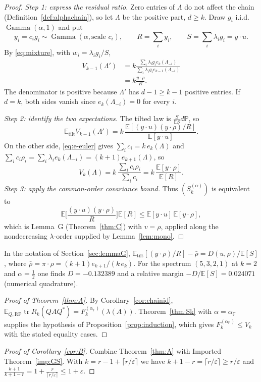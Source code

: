\documentclass[11pt,a4paper]{article}
\theoremstyle{definition}
\newcommand{\E}{\mathbb{E}}
\newcommand{\PP}{\mathbb{P}}
\newcommand{\F}{\mathbb{F}}
\newcommand{\tr}{\operatorname{tr}}
\newcommand{\Gam}{\operatorname{Gamma}}
\newcommand{\tilt}{\mathrm{tilt}}
\newcommand{\RP}{\mathrm{RP}}
\begin{document}
\begin{proof}
\emph{Step 1: express the residual ratio.}
Zero entries of $\Lambda$ do not affect the chain (Definition~\ref{def:alphachain}), so let $\Lambda$ be the positive part, $d\ge k$. Draw $g_i$ i.i.d.\ $\Gam(\alpha,1)$ and put
\[
y_i=c_ig_i\sim\Gam(\alpha,\text{scale }c_i),\qquad R=\sum_iy_i,\qquad S=\sum_i\lambda_ig_i=y\cdot u .
\]
By \eqref{eq:mixture}, with $w_i=\lambda_ig_i/S$,
\[
\begin{aligned}
V_{k-1}(\Lambda')
&=k\frac{\sum_i\lambda_ig_i e_k(\Lambda_{-i})}
          {\sum_i\lambda_ig_i e_{k-1}(\Lambda_{-i})}\\
&=k\frac{y\cdot\rho}{R}.
\end{aligned}
\]
The denominator is positive because $\Lambda'$ has $d-1\ge k-1$ positive entries. If $d=k$, both sides vanish since $e_k(\Lambda_{-i})=0$ for every $i$.

\emph{Step 2: identify the two expectations.}
The tilted law is $\frac S{\E S}d\PP$, so
\[
\E_\tilt V_{k-1}(\Lambda')=k\,\frac{\E[(y\cdot u)(y\cdot\rho)/R]}{\E[y\cdot u]}.
\]
On the other side, \eqref{eq:e-euler} gives $\sum_ic_i=k\,e_k(\Lambda)$ and $\sum_ic_i\rho_i=\sum_i\lambda_ie_k(\Lambda_{-i})=(k+1)e_{k+1}(\Lambda)$, so
\[
V_k(\Lambda)=k\,\frac{\sum_ic_i\rho_i}{\sum_ic_i}=k\,\frac{\E[y\cdot\rho]}{\E[R]}.
\]
\emph{Step 3: apply the common-order covariance bound.}
Thus $(S_k^{(\alpha)})$ is equivalent to
\[
\E\Big[\frac{(y\cdot u)(y\cdot\rho)}R\Big]\E[R]\le\E[y\cdot u]\,\E[y\cdot\rho],
\]
which is Lemma~G (Theorem~\ref{thm:C}) with $v=\rho$, applied along the nondecreasing $\lambda$-order supplied by Lemma~\ref{lem:mono}.
\end{proof}

In the notation of Section~\ref{sec:lemmaG}, $\E_\tilt[(y\cdot\rho)/R]-\bar\rho=D(u,\rho)/\E[S]$, where $\bar\rho=\pi\cdot\rho=(k+1)e_{k+1}/(k\,e_k)$. For the spectrum $(5,3,2,1)$ at $k=2$ and $\alpha=\frac12$ one finds $D=-0.132389$ and a relative margin $-D/\E[S]=0.024071$ (numerical quadrature).

\begin{proof}[Proof of Theorem~\ref{thm:A}]
By Corollary~\ref{cor:chainid}, $\E_{Q,\RP}\tr R_k(QAQ^*)=F_k^{(\alpha_\F)}(\lambda(A))$. Theorem~\ref{thm:Sk} with $\alpha=\alpha_\F$ supplies the hypothesis of Proposition~\ref{prop:induction}, which gives $F^{(\alpha_\F)}_k\le V_k$ with the stated equality cases.
\end{proof}

\begin{proof}[Proof of Corollary~\ref{cor:B}]
Combine Theorem~\ref{thm:A} with Imported Theorem~\ref{imp:GS}. With $k=r-1+\lceil r/\varepsilon\rceil$ we have $k+1-r=\lceil r/\varepsilon\rceil\ge r/\varepsilon$ and $\frac{k+1}{k+1-r}=1+\frac r{\lceil r/\varepsilon\rceil}\le1+\varepsilon$.
\end{proof}
\end{document}
